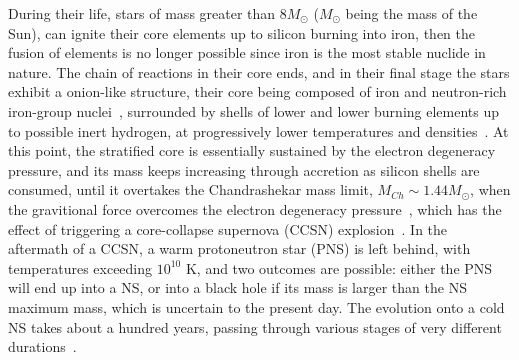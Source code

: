 During their life, stars of mass greater than $8M_\odot$ ($M_\odot$ being the
mass of the Sun), can ignite their core elements up to silicon burning into 
iron, then the fusion of elements is 
no longer possible since iron is the most stable nuclide in nature. 
The chain of reactions in their core ends, and in their final stage the stars 
exhibit a onion-like structure, their core being composed of iron and 
neutron-rich iron-group nuclei~\cite{Bethe1979}, surrounded by shells of lower 
and lower burning elements up to possible inert hydrogen, at progressively 
lower temperatures and densities~\cite{Woosley2002}. 
At this point, the stratified core is essentially sustained by the electron
degeneracy pressure, and its mass keeps increasing through accretion as silicon 
shells are consumed, until it overtakes the Chandrashekar mass limit, $M_{Ch}
\sim 1.44M_\odot$, when the gravitional force overcomes the electron degeneracy
pressure~\cite{Chandrasekhar1931}, which has the effect of triggering a 
core-collapse supernova (CCSN) explosion~\cite{Janka2007}.
In the aftermath of a CCSN, a warm protoneutron star (PNS) is left behind, with
temperatures exceeding $10^{10}$ K, and two outcomes are possible: either the 
PNS will end up into a NS, or into a black hole if its mass is larger 
than the NS maximum mass, which is uncertain to the present day. 
The evolution onto a cold NS takes about a hundred years, passing through 
various stages of very different durations~\cite{Prakash1997}. 
 
